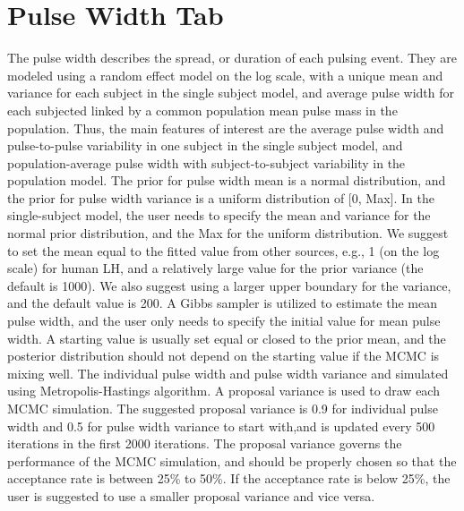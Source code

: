 \documentclass[11pt]{book}
\begin{document}
\section{Pulse Width Tab}
The pulse width describes the spread, or duration of each pulsing event. They are modeled using a random effect model on the log scale, with a unique mean and variance for each subject in the single subject model, and average pulse width for each subjected linked by a common population mean pulse mass in the population. Thus, the main features of interest are the average pulse width and pulse-to-pulse variability in one subject in the single subject model, and population-average pulse width with subject-to-subject variability in the population model. The prior for pulse width mean is a normal distribution, and the prior for pulse width variance is a uniform distribution of [0, Max]. In the single-subject model, the user needs to specify the mean and variance for the normal prior distribution, and the Max for the uniform distribution. We suggest to set the mean equal to the fitted value from other sources, e.g., 1 (on the log scale) for human LH, and a relatively large value for the prior variance (the default is 1000). We also suggest using a larger upper boundary for the variance, and the default value is 200. A Gibbs sampler is utilized to estimate the mean pulse width, and the user only needs to specify the initial value for mean pulse width.  A starting value is usually set equal or closed to the prior mean, and the posterior distribution should not depend on the starting value if the MCMC is mixing well. The individual pulse width and pulse width variance and simulated using Metropolis-Hastings algorithm. A proposal variance is used to draw each MCMC simulation. The suggested proposal variance  is 0.9 for individual pulse width and 0.5 for pulse width variance to start with,and is updated every 500 iterations in the first 2000 iterations. The proposal variance governs the performance of the MCMC simulation, and should be properly chosen so that the acceptance rate is between 25\% to 50\%. If the acceptance rate is below 25\%, the user is suggested to use a smaller proposal variance and vice versa.
\end{document}
